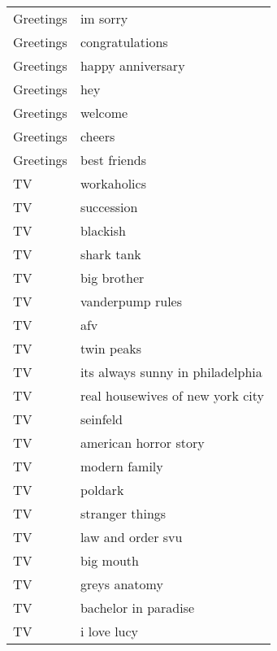 \begin{supertabular}{l p{0.25\textwidth}}
        Greetings &                           im sorry \\
        Greetings &                    congratulations \\
        Greetings &                  happy anniversary \\
        Greetings &                                hey \\
        Greetings &                            welcome \\
        Greetings &                             cheers \\
        Greetings &                       best friends \\
               TV &                        workaholics \\
               TV &                         succession \\
               TV &                           blackish \\
               TV &                         shark tank \\
               TV &                        big brother \\
               TV &                   vanderpump rules \\
               TV &                                afv \\
               TV &                         twin peaks \\
               TV &   its always sunny in philadelphia \\
               TV &   real housewives of new york city \\
               TV &                           seinfeld \\
               TV &              american horror story \\
               TV &                      modern family \\
               TV &                            poldark \\
               TV &                    stranger things \\
               TV &                  law and order svu \\
               TV &                          big mouth \\
               TV &                      greys anatomy \\
               TV &               bachelor in paradise \\
               TV &                        i love lucy \\

\end{supertabular}

